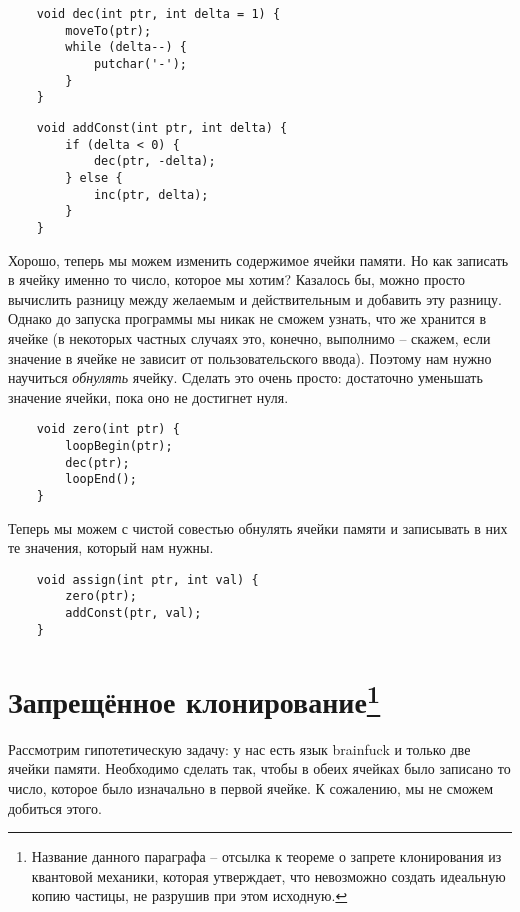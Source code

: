 \documentclass{book}
\begin{document}
\begin{verbatim}
    void dec(int ptr, int delta = 1) {
        moveTo(ptr);
        while (delta--) {
            putchar('-');
        }
    }
\end{verbatim}

\begin{verbatim}
    void addConst(int ptr, int delta) {
        if (delta < 0) {
            dec(ptr, -delta);
        } else {
            inc(ptr, delta);
        }
    }
\end{verbatim}

Хорошо, теперь мы можем изменить содержимое ячейки памяти. Но как записать в ячейку именно то число,
которое мы хотим? Казалось бы, можно просто вычислить разницу между желаемым и действительным и добавить
эту разницу. Однако до запуска программы мы никак не сможем узнать, что же хранится в ячейке (в некоторых
частных случаях это, конечно, выполнимо -- скажем, если значение в ячейке не зависит от пользовательского
ввода). Поэтому нам нужно научиться {\em обнулять} ячейку. Сделать это очень просто: достаточно уменьшать
значение ячейки, пока оно не достигнет нуля. 

\begin{verbatim}
    void zero(int ptr) {
        loopBegin(ptr); 
        dec(ptr);
        loopEnd();        
    }
\end{verbatim}

Теперь мы можем с чистой совестью обнулять ячейки памяти и записывать в них те значения, который нам нужны.

\begin{verbatim}
    void assign(int ptr, int val) {
        zero(ptr);
        addConst(ptr, val);
    }
\end{verbatim}

\section[Запрещённое клонирование]{Запрещённое клонирование\protect\footnote{Название данного параграфа --
отсылка к теореме о запрете клонирования из квантовой механики, которая утверждает, что невозможно создать
идеальную копию частицы, не разрушив при этом исходную.}}
Рассмотрим гипотетическую задачу: у нас есть язык brainfuck и только две ячейки памяти. Необходимо сделать так,
чтобы в обеих ячейках было записано то число, которое было изначально в первой ячейке. К сожалению, мы не
сможем добиться этого. 
\end{document}
